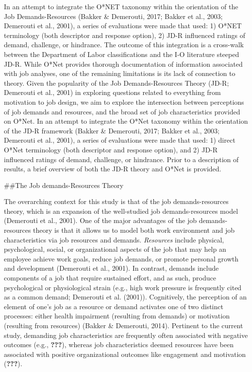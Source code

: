 \documentclass[
  english,
  man]{apa6}
\begin{document}
In an attempt to integrate the O*NET taxonomy within the orientation of the Job Demands-Resources (Bakker \& Demerouti, 2017; Bakker et al., 2003; Demerouti et al., 2001), a series of evaluations were made that used: 1) O*NET terminology (both descriptor and response option), 2) JD-R influenced ratings of demand, challenge, or hindrance. The outcome of this integration is a cross-walk between the Department of Labor classifications and the I-O literature steeped JD-R. While O*Net provides thorough documentation of information associated with job analyses, one of the remaining limitations is its lack of connection to theory. Given the popularity of the Job Demands-Resources Theory (JD-R; Demerouti et al., 2001) in exploring questions related to everything from motivation to job design, we aim to explore the intersection between perceptions of job demands and resources, and the broad set of job characteristics provided on O*Net. In an attempt to integrate the O*Net taxonomy within the orientation of the JD-R framework (Bakker \& Demerouti, 2017; Bakker et al., 2003; Demerouti et al., 2001), a series of evaluations were made that used: 1) direct O*Net terminology (both descriptor and response option), and 2) JD-R influenced ratings of demand, challenge, or hindrance. Prior to a description of results, a brief overview of both the JD-R theory and O*Net is provided.

\#\#The Job demands-Resources Theory

The overarching context for this study is that of the job demands-resources theory, which is an expansion of the well-studied job demands-resources model (Demerouti et al., 2001). One of the major advantages of the job demands-resources theory is that it allows us to model both work environment and job characteristics via job resources and demands. \emph{Resources} include physical, psychological, social, or organizational aspects of the job that may help an employee achieve work goals, reduce job demands, or promote personal growth and development (Demerouti et al., 2001). In contrast, demands include components of a job that require sustained effort, and as such, produce psychological or physiological strain (e.g., high work pressure is frequently cited as a common demand; Demerouti et al. (2001)).
Cognitively, the perception of an element of one's job as a resource or demand activates one of two distinct processes: either health impairment (resulting from demands) or motivation (resulting from resources) (Bakker \& Demerouti, 2014). Pertinent to the current study, demanding job characteristics are frequently often associated with negative outcomes (e.g., {\textbf{???}}), whereas job characteristics deemed resources have been associated with positive organizational outcomes like engagement and motivation ({\textbf{???}}).
\end{document}
